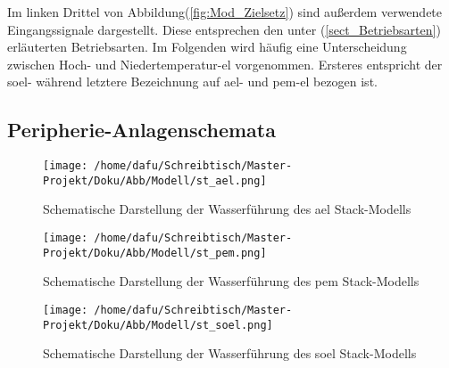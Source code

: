\documentclass[onecolumn,10pt,titlepage]{article}
\begin{document}
Im linken Drittel von Abbildung(\ref{fig:Mod_Zielsetz}) sind außerdem verwendete Eingangssignale dargestellt. Diese entsprechen den unter (\ref{sect_Betriebsarten}) erläuterten Betriebsarten. 
Im Folgenden wird häufig eine Unterscheidung zwischen Hoch- und Niedertemperatur-\gls{el} vorgenommen. Ersteres entspricht der \gls{soel}- während letztere Bezeichnung auf \gls{ael}- und \gls{pem}-\gls{el} bezogen ist.
%
%
%
%
%
%
%




\subsection{Peripherie-Anlagenschemata}
\label{subs_peri_schem}

\begin{figure}[!tbp]
	\centering
	\begin{minipage}[t]{0.32\textwidth}
		\texttt{[image: /home/dafu/Schreibtisch/Master-Projekt/Doku/Abb/Modell/st\_ael.png]}
		
		\caption[Schema: Wasserführung \gls{ael}-Stack]{Schematische Darstellung der Wasserführung des \gls{ael} Stack-Modells}
		\label{fig:stack_schem_ael} 
	\end{minipage}
	\hfill
	\begin{minipage}[t]{0.32\textwidth}
		\texttt{[image: /home/dafu/Schreibtisch/Master-Projekt/Doku/Abb/Modell/st\_pem.png]}
		
		\caption[Schema: Wasserführung \gls{pem}-Stack]{Schematische Darstellung der Wasserführung des \gls{pem} Stack-Modells}
		\label{fig:stack_schem_pem} 
	\end{minipage}
	\hfill
	\begin{minipage}[t]{0.32\textwidth}
		\texttt{[image: /home/dafu/Schreibtisch/Master-Projekt/Doku/Abb/Modell/st\_soel.png]}
		
		\caption[Schema: Wasserführung \gls{soel}-Stack]{Schematische Darstellung der Wasserführung des \gls{soel} Stack-Modells}
		\label{fig:stack_schem_soel} 
	\end{minipage}
\end{figure}
\end{document}

